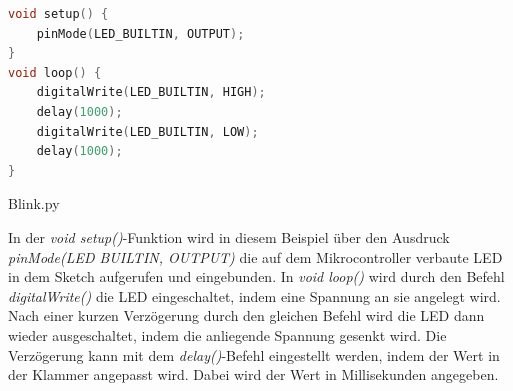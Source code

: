 \begin{code}
	\begin{lstlisting}[language=c++]
void setup() {
	pinMode(LED_BUILTIN, OUTPUT);
}
void loop() {
	digitalWrite(LED_BUILTIN, HIGH);
	delay(1000);                     
	digitalWrite(LED_BUILTIN, LOW);  
	delay(1000);                     
}
\end{lstlisting}      

\caption[Blink.py]{Blink.py}\label{Code:Blink}    
\end{code} 

In der \textit{void setup()}-Funktion wird in diesem Beispiel über den Ausdruck \textit{pinMode(LED BUILTIN, OUTPUT)} die auf dem Mikrocontroller verbaute LED in dem Sketch aufgerufen und eingebunden.
In \textit{void loop()} wird durch den Befehl\textit{ digitalWrite()} die LED eingeschaltet, indem eine Spannung an sie angelegt wird. Nach einer kurzen Verzögerung durch den gleichen Befehl wird die LED dann wieder ausgeschaltet, indem die anliegende Spannung gesenkt wird. Die Verzögerung kann mit dem \textit{delay()}-Befehl eingestellt werden, indem der Wert in der Klammer angepasst wird. Dabei wird der Wert in Millisekunden angegeben.
